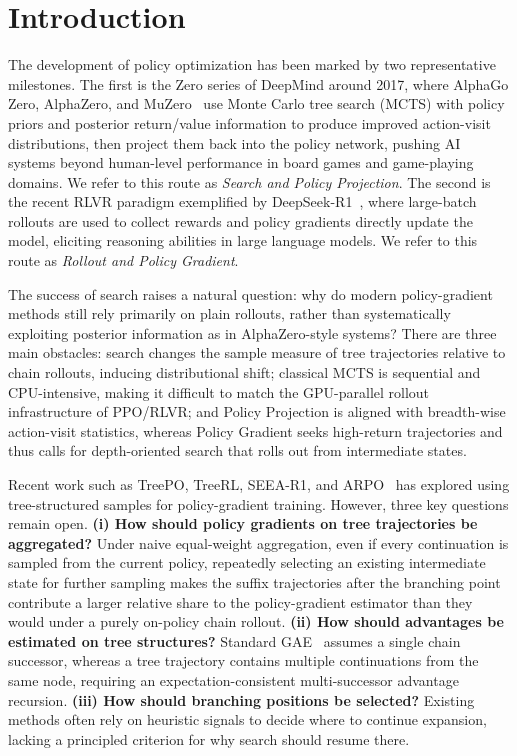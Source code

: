 \section{Introduction}
\label{sec:introduction}

The development of policy optimization has been marked by two representative milestones. The first is the Zero series of DeepMind around 2017, where AlphaGo Zero, AlphaZero, and MuZero~\citep{ref_alphagozero,ref_alphazero,ref_muzero} use Monte Carlo tree search (MCTS) with policy priors and posterior return/value information to produce improved action-visit distributions, then project them back into the policy network, pushing AI systems beyond human-level performance in board games and game-playing domains. We refer to this route as \emph{Search and Policy Projection}. The second is the recent RLVR paradigm exemplified by DeepSeek-R1~\citep{ref_r1}, where large-batch rollouts are used to collect rewards and policy gradients directly update the model, eliciting reasoning abilities in large language models. We refer to this route as \emph{Rollout and Policy Gradient}.

The success of search raises a natural question: why do modern policy-gradient methods still rely primarily on plain rollouts, rather than systematically exploiting posterior information as in AlphaZero-style systems? There are three main obstacles: search changes the sample measure of tree trajectories relative to chain rollouts, inducing distributional shift; classical MCTS is sequential and CPU-intensive, making it difficult to match the GPU-parallel rollout infrastructure of PPO/RLVR; and Policy Projection is aligned with breadth-wise action-visit statistics, whereas Policy Gradient seeks high-return trajectories and thus calls for depth-oriented search that rolls out from intermediate states.

Recent work such as TreePO, TreeRL, SEEA-R1, and ARPO~\citep{ref_treepo,ref_treerl,ref_seear1,ref_arpo} has explored using tree-structured samples for policy-gradient training. However, three key questions remain open. \textbf{(i) How should policy gradients on tree trajectories be aggregated?} Under naive equal-weight aggregation, even if every continuation is sampled from the current policy, repeatedly selecting an existing intermediate state for further sampling makes the suffix trajectories after the branching point contribute a larger relative share to the policy-gradient estimator than they would under a purely on-policy chain rollout. \textbf{(ii) How should advantages be estimated on tree structures?} Standard GAE~\citep{ref_gae} assumes a single chain successor, whereas a tree trajectory contains multiple continuations from the same node, requiring an expectation-consistent multi-successor advantage recursion. \textbf{(iii) How should branching positions be selected?} Existing methods often rely on heuristic signals to decide where to continue expansion, lacking a principled criterion for why search should resume there.

